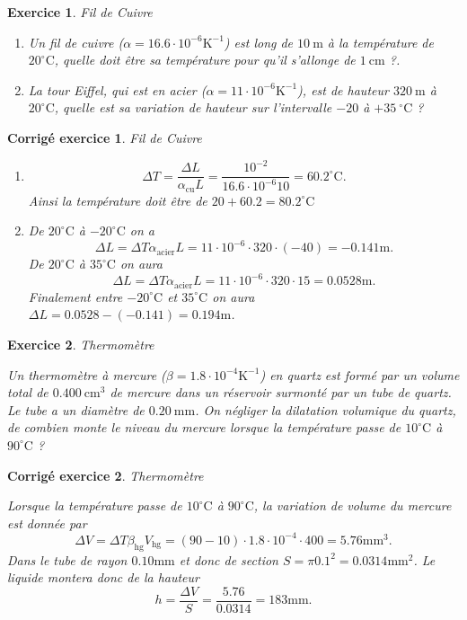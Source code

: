\documentclass[a4paper,12pt]{article}
\newtheorem{exercice}{Exercice}
\newtheorem{corrige}{Corrig\'e exercice}
\newcommand{\cm}{\mathrm{cm}}
\newcommand{\mm}{\mathrm{mm}}
\newcommand{\m}{\mathrm{m}}
\newcommand{\K}{\mathrm{K}}
\newcommand{\C}{\mathrm{C}}
\newcommand{\oC}{^\circ\C}
\begin{document}
\begin{exercice}{Fil de Cuivre}

\begin{enumerate}
	\item Un fil de cuivre ($\alpha=16.6\cdot 10^{-6}\K^{-1}$) est long de $10\ \m$ à la température de $20\oC$, quelle doit être sa
température pour qu'il s'allonge de $1\ \cm$ ?.
	\item La tour Eiffel, qui est en acier ($\alpha=11\cdot 10^{-6}\K^{-1}$), est de hauteur $320\ \m$ à $20\oC$, quelle est sa variation de hauteur
sur l’intervalle $-20$ à $+35\ \oC$ ?
\end{enumerate}
\end{exercice}

\begin{corrige}{Fil de Cuivre}
\begin{enumerate}
	\item 
\begin{equation}
\Delta T=\frac{\Delta L}{\alpha_\mathrm{cu}L}=\frac{10^{-2}}{16.6\cdot10^{-6}10}=60.2^\circ\C.
\end{equation}
Ainsi la température doit être de $20+60.2=80.2^\circ\C$
\item De $20\oC$ à $-20\oC$ on a 
\begin{equation}
\Delta L=\Delta T \alpha_\mathrm{acier}L=11\cdot10^{-6}\cdot 320\cdot(-40)=-0.141\m.
\end{equation}
De $20\oC$ à $35\oC$ on aura
\begin{equation}
\Delta L=\Delta T \alpha_\mathrm{acier}L=11\cdot10^{-6}\cdot 320\cdot15=0.0528\m.
\end{equation}
Finalement entre $-20\oC$ et $35\oC$ on aura $\Delta L=0.0528-(-0.141)=0.194\m$.
\end{enumerate}
\end{corrige}

\begin{exercice}{Thermomètre}

Un thermomètre à mercure ($\beta=1.8\cdot 10^{-4}\K^{-1}$) en quartz est formé par un volume total de $0.400\ \cm^3$ de mercure
dans un réservoir surmonté par un tube de quartz. Le tube a un diamètre de $0.20\ \mm$.
On négliger la dilatation volumique du quartz, de combien monte le niveau du mercure
lorsque la température passe de $10\oC$ à $90\oC$ ?
\end{exercice}

\begin{corrige}{Thermomètre}

Lorsque la température passe de $10\oC$ à $90\oC$, la variation de volume du mercure est donnée par 
\begin{equation}
\Delta V=\Delta T \beta_\mathrm{hg}V_\mathrm{hg}=(90-10)\cdot 1.8\cdot 10^{-4}\cdot 400=5.76\mm^3.
\end{equation}
Dans le tube de rayon $0.10\mm$ et donc de section $S=\pi 0.1^2=0.0314\mm^2$.
Le liquide montera donc de la hauteur  
\begin{equation}
h=\frac{\Delta V}{S}=\frac{5.76}{0.0314}=183\mm.
\end{equation}

\end{corrige}
\end{document}
